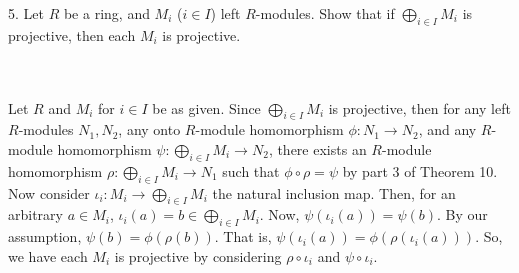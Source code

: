 5. Let $R$ be a ring, and $M_i$ ($i\in I$) left $R$-modules. Show that if $\bigoplus_{i\in I}M_i$ is
projective, then each $M_i$ is projective.\\\\

\begin{solution}\renewcommand{\qedsymbol}{}\ \\
    Let $R$ and $M_i$ for $i\in I$ be as given. Since $\bigoplus_{i\in I}M_i$ is projective, then for
    any left $R$-modules $N_1, N_2$, any onto $R$-module homomorphism $\phi:N_1\rightarrow N_2$, and any
    $R$-module homomorphism $\psi:\bigoplus_{i\in I}M_i\rightarrow N_2$, there exists an $R$-module
    homomorphism $\rho:\bigoplus_{i\in I}M_i\rightarrow N_1$ such that $\phi\circ\rho=\psi$ by part 3 of
    Theorem 10. Now consider $\iota_i:M_i\rightarrow\bigoplus_{i\in I}M_i$ the natural inclusion map.
    Then, for an arbitrary $a\in M_i$, $\iota_i(a)=b\in\bigoplus_{i\in I}M_i$. Now,
    $\psi(\iota_i(a))=\psi(b)$. By our assumption, $\psi(b)=\phi(\rho(b))$. That is,
    $\psi(\iota_i(a))=\phi(\rho(\iota_i(a)))$. So, we have each $M_i$ is projective by considering
    $\rho\circ\iota_i$ and $\psi\circ\iota_i$.

\end{solution}